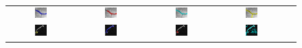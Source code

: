 \begin{figure}[t]
\begin{tabular}{@{}ccccc@{}}
\includegraphics[width=0.19\textwidth]{images/L2S_compare_region/22_trng_CV}	&
\includegraphics[width=0.19\textwidth]{images/L2S_compare_region/22_trng_Lankton}		&
\includegraphics[width=0.19\textwidth]{images/L2S_compare_region/22_trng_Li}	&
\includegraphics[width=0.19\textwidth]{images/L2S_compare_region/22_trng_ours}	
\\
\includegraphics[width=0.19\textwidth]{images/L2S_compare_region/dendrites2_orig}	&
\includegraphics[width=0.19\textwidth]{images/L2S_compare_region/dendrites2_CV}	&
\includegraphics[width=0.19\textwidth]{images/L2S_compare_region/dendrites2_Lankton} &
\includegraphics[width=0.19\textwidth]{images/L2S_compare_region/dendrites2_Li}	&

\end{tabular}
\end{figure}

